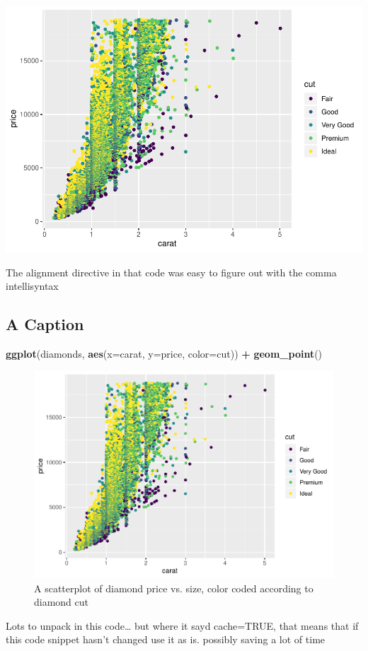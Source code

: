 \documentclass[]{article}
\newenvironment{Shaded}{\begin{snugshade}}{\end{snugshade}}
\newcommand{\DataTypeTok}[1]{\textcolor[rgb]{0.13,0.29,0.53}{#1}}
\newcommand{\KeywordTok}[1]{\textcolor[rgb]{0.13,0.29,0.53}{\textbf{#1}}}
\newcommand{\NormalTok}[1]{#1}
\newcommand{\OperatorTok}[1]{\textcolor[rgb]{0.81,0.36,0.00}{\textbf{#1}}}
\newcommand{\StringTok}[1]{\textcolor[rgb]{0.31,0.60,0.02}{#1}}
\begin{document}
\begin{center}\includegraphics{rmarkdown_primer_ec_files/figure-latex/Align-my-diamonds-plot-1} \end{center}

The alignment directive in that code was easy to figure out with the
comma intellisyntax

\hypertarget{a-caption}{%
\subsection{A Caption}\label{a-caption}}

\begin{Shaded}
\begin{Highlighting}[]
\KeywordTok{ggplot}\NormalTok{(diamonds, }\KeywordTok{aes}\NormalTok{(}\DataTypeTok{x=}\NormalTok{carat, }\DataTypeTok{y=}\NormalTok{price, }\DataTypeTok{color=}\NormalTok{cut)) }\OperatorTok{+}\StringTok{ }\KeywordTok{geom_point}\NormalTok{()}
\end{Highlighting}
\end{Shaded}

\begin{figure}

{\centering \includegraphics{rmarkdown_primer_ec_files/figure-latex/plot-diamond-with-caption-1} 

}

\caption{A scatterplot of diamond price vs. size, color coded according to diamond cut}\label{fig:plot-diamond-with-caption}
\end{figure}

Lots to unpack in this code\ldots{} but where it sayd cache=TRUE, that
means that if this code snippet hasn't changed use it as is. possibly
saving a lot of time
\end{document}
